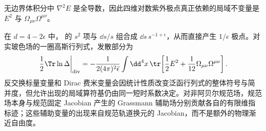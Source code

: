 无边界体积分中 \(\nabla^2E\) 是全导数，因此四维对数紫外极点真正依赖的局域不变量是 \(E^2\) 与 \(\Omega_{\mu\nu}\Omega^{\mu\nu}\)。

在 \(d=4-2\epsilon\) 中， 的 \(s^2\) 项与 \(\dd s/s\) 组合成 \(\dd s\,s^{-1+\epsilon}\)，从而直接产生 \(1/\epsilon\) 极点。对实玻色场的一圈高斯行列式，发散部分为
\begin{equation}
 {
 \left.\frac12\Tr\ln\Delta\right|_{\rm div}
 =-\frac1{2(4\pi)^2\bar\epsilon}
 \int\dd^4 x\,
 \tr\!\left[
 \frac12E^2+\frac1{12}\Omega_{\mu\nu}\Omega^{\mu\nu}
 \right].}
 \label{eq:heat-kernel-divergence-master-dp11}
\end{equation}
反交换标量变量和 Dirac 费米变量会因统计性质改变泛函行列式的整体符号与简并度，但允许出现的局域算符基仍由同一短时系数决定。对非阿贝尔规范场，规范场本身与规范固定 Jacobian 产生的 Grassmann 辅助场分别贡献各自的有限维指标迹；这些辅助变量的出现来自规范轨道换元的 Jacobian，而不是额外的物理渐近自由度。
